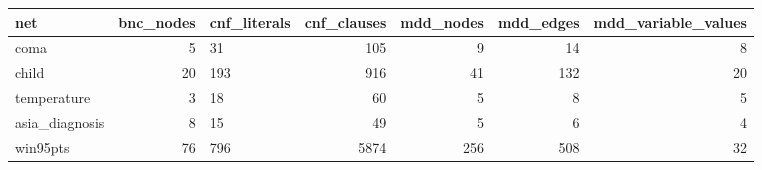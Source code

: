 \begin{tabular}{lrlrrrr}
\toprule
           net &  bnc\_nodes & cnf\_literals &  cnf\_clauses &  mdd\_nodes &  mdd\_edges &  mdd\_variable\_values \\
\midrule
          coma &          5 &           31 &          105 &          9 &         14 &                    8 \\
         child &         20 &          193 &          916 &         41 &        132 &                   20 \\
   temperature &          3 &           18 &           60 &          5 &          8 &                    5 \\
asia\_diagnosis &          8 &           15 &           49 &          5 &          6 &                    4 \\
      win95pts &         76 &          796 &         5874 &        256 &        508 &                   32 \\
\bottomrule
\end{tabular}
